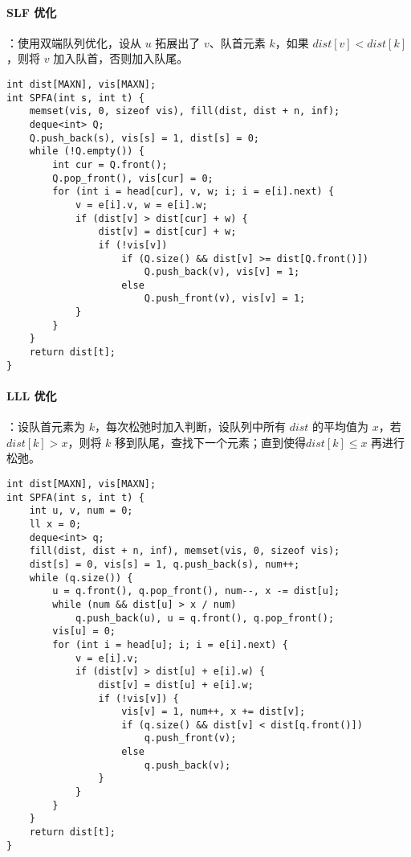 \paragraph{SLF 优化}：使用双端队列优化，设从 $u$ 拓展出了 $v$、队首元素 $k$，如果 $dist[v] < dist[k]$，则将 $v$ 加入队首，否则加入队尾。
\begin{verbatim}
int dist[MAXN], vis[MAXN];
int SPFA(int s, int t) {
    memset(vis, 0, sizeof vis), fill(dist, dist + n, inf);
    deque<int> Q;
    Q.push_back(s), vis[s] = 1, dist[s] = 0;
    while (!Q.empty()) {
        int cur = Q.front();
        Q.pop_front(), vis[cur] = 0;  
        for (int i = head[cur], v, w; i; i = e[i].next) {
            v = e[i].v, w = e[i].w;
            if (dist[v] > dist[cur] + w) {
                dist[v] = dist[cur] + w;
                if (!vis[v])
                    if (Q.size() && dist[v] >= dist[Q.front()])
                        Q.push_back(v), vis[v] = 1;
                    else
                        Q.push_front(v), vis[v] = 1;
            }
        }
    }
    return dist[t];
}    
\end{verbatim}

\paragraph{LLL 优化}：设队首元素为 $k$，每次松弛时加入判断，设队列中所有 $dist$ 的平均值为 $x$，若 $dist[k] > x$，则将 $k$ 移到队尾，查找下一个元素；直到使得$dist[k] \le x$ 再进行松弛。
\begin{verbatim}
int dist[MAXN], vis[MAXN];
int SPFA(int s, int t) {
    int u, v, num = 0;
    ll x = 0;
    deque<int> q;
    fill(dist, dist + n, inf), memset(vis, 0, sizeof vis);
    dist[s] = 0, vis[s] = 1, q.push_back(s), num++;
    while (q.size()) {
        u = q.front(), q.pop_front(), num--, x -= dist[u];
        while (num && dist[u] > x / num)
            q.push_back(u), u = q.front(), q.pop_front();
        vis[u] = 0;
        for (int i = head[u]; i; i = e[i].next) {
            v = e[i].v;
            if (dist[v] > dist[u] + e[i].w) {
                dist[v] = dist[u] + e[i].w;
                if (!vis[v]) {
                    vis[v] = 1, num++, x += dist[v];
                    if (q.size() && dist[v] < dist[q.front()])
                        q.push_front(v);
                    else
                        q.push_back(v);
                }
            }
        }
    }
    return dist[t];
}        
\end{verbatim}
\clearpage
